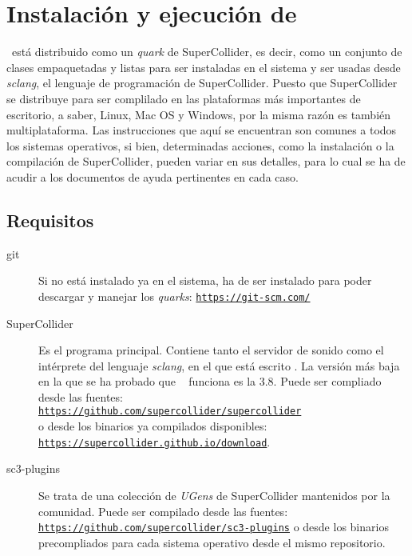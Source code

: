  \chapter[Instalación y ejecución de \appName]{Instalación y ejecución de \appName}

\appName~está distribuido como un \textit{quark} de SuperCollider, es decir, como un conjunto de clases empaquetadas y listas para ser instaladas en el sistema y ser usadas desde \textit{sclang}, el lenguaje de programación de SuperCollider.  Puesto que SuperCollider se distribuye para ser complilado en las plataformas más importantes de escritorio, a saber, Linux, Mac OS y Windows, por la misma razón \appName es también multiplataforma. Las instrucciones que aquí se encuentran son comunes a todos los sistemas operativos, si bien, determinadas acciones, como la instalación o la compilación de SuperCollider, pueden variar en sus detalles, para lo cual se ha de acudir a los documentos de ayuda pertinentes en cada caso.

\section{Requisitos}
\begin{description}
	\item[git] Si no está instalado ya en el sistema, ha de ser instalado para poder descargar y manejar los \textit{quarks}: \href{https://git-scm.com/}{\texttt{https://git-scm.com/}}
	
	\item[SuperCollider] Es el programa principal. Contiene tanto el servidor de sonido como el intérprete del lenguaje \textit{sclang}, en el que está escrito \appName. La versión más baja en la que se ha probado que \appName~ funciona es la 3.8. Puede ser compliado desde las fuentes:\\ \href{https://github.com/supercollider/supercollider}{\texttt{https://github.com/supercollider/supercollider}}\\ o desde los binarios ya compilados disponibles:\\ \href{https://supercollider.github.io/download}{\texttt{https://supercollider.github.io/download}}.
	
	\item[sc3-plugins]  Se trata de una colección de \textit{UGens} de SuperCollider mantenidos por la comunidad. Puede ser compilado desde las fuentes:\\ \href{https://github.com/supercollider/sc3-plugins}{\texttt{https://github.com/supercollider/sc3-plugins}} o desde los binarios precompliados para cada sistema operativo desde el mismo repositorio.
\end{description}

